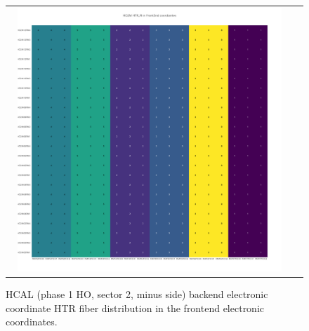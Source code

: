 \begin{figure}[htb]
 \begin{center}
  \begin{tabular}{cc}
   \includegraphics[angle=0,width=0.95\textwidth]{figures/appendix/HO2M_HTR_FI_in_FrontEnd.png}
  \end{tabular}
  \caption{HCAL (phase 1 HO, sector 2, minus side) backend electronic coordinate HTR fiber distribution in the frontend electronic coordinates.}
  \label{fig:lmapHO2MHTRFIFEC}
 \end{center}
\end{figure}
\clearpage

